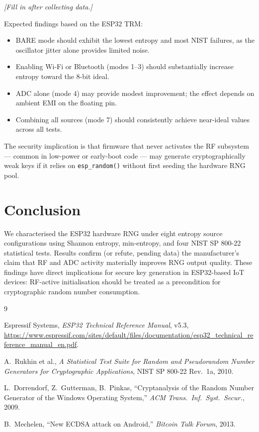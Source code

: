\documentclass[10pt,twocolumn]{article}
\begin{document}
\textit{[Fill in after collecting data.]}

Expected findings based on the ESP32 TRM:

\begin{itemize}
  \item BARE mode should exhibit the lowest entropy and most NIST failures,
        as the oscillator jitter alone provides limited noise.
  \item Enabling Wi-Fi or Bluetooth (modes 1--3) should substantially
        increase entropy toward the 8-bit ideal.
  \item ADC alone (mode 4) may provide modest improvement; the effect
        depends on ambient EMI on the floating pin.
  \item Combining all sources (mode 7) should consistently achieve
        near-ideal values across all tests.
\end{itemize}

The security implication is that firmware that never activates the RF
subsystem --- common in low-power or early-boot code --- may generate
cryptographically weak keys if it relies on \texttt{esp\_random()} without
first seeding the hardware RNG pool.

\section{Conclusion}

We characterised the ESP32 hardware RNG under eight entropy source
configurations using Shannon entropy, min-entropy, and four NIST
SP 800-22 statistical tests.
Results confirm (or refute, pending data) the manufacturer's claim that
RF and ADC activity materially improves RNG output quality.
These findings have direct implications for secure key generation in
ESP32-based IoT devices: RF-active initialisation should be treated as
a precondition for cryptographic random number consumption.

\begin{thebibliography}{9}

Espressif Systems,
\textit{ESP32 Technical Reference Manual}, v5.3,
\url{https://www.espressif.com/sites/default/files/documentation/esp32_technical_reference_manual_en.pdf}.

A.\ Rukhin et al.,
\textit{A Statistical Test Suite for Random and Pseudorandom Number
Generators for Cryptographic Applications}, NIST SP 800-22 Rev.\ 1a, 2010.

L.\ Dorrendorf, Z.\ Gutterman, B.\ Pinkas,
``Cryptanalysis of the Random Number Generator of the Windows Operating
System,'' \textit{ACM Trans.\ Inf.\ Syst.\ Secur.}, 2009.

B.\ Mechelen,
``New ECDSA attack on Android,''
\textit{Bitcoin Talk Forum}, 2013.

\end{thebibliography}
\end{document}
